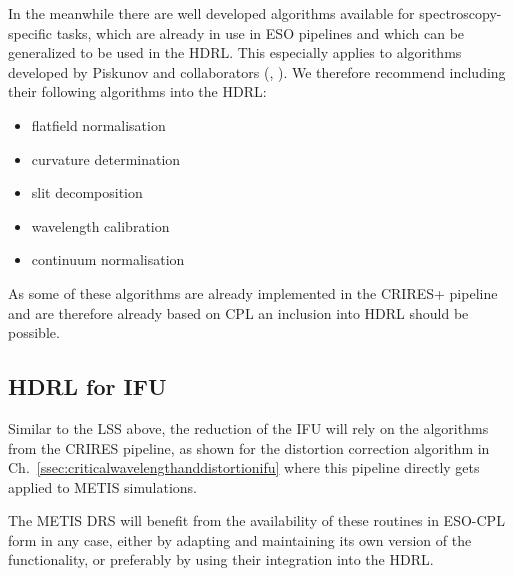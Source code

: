 In the meanwhile there are well developed algorithms available for spectroscopy-specific tasks, which are already in use in ESO pipelines and which can be generalized to be used in the \ac{HDRL}. This especially applies to algorithms developed by Piskunov and collaborators (\cite{pis21}, \cite{pis02}). We therefore recommend including their following algorithms into the \ac{HDRL}:
\begin{itemize}
    \item flatfield normalisation
    \item curvature determination
    \item slit decomposition
    \item wavelength calibration
    \item continuum normalisation
\end{itemize}
As some of these algorithms are already implemented in the \ac{CRIRES}+ pipeline
and are therefore already based on \ac{CPL} an inclusion into \ac{HDRL} should
be possible.

\subsection{HDRL for IFU}
\label{ssec:hdrllms}

Similar to the LSS above, the reduction of the IFU will rely on the algorithms
from the \ac{CRIRES} pipeline, as shown for the distortion correction algorithm
in Ch.~\ref{ssec:criticalwavelengthanddistortionifu} where this pipeline
directly gets applied to METIS simulations.

The METIS \ac{DRS} will benefit from the availability of these routines in ESO-CPL
form in any case, either by adapting and maintaining its own version of the
functionality, or preferably by using their integration into the HDRL. 